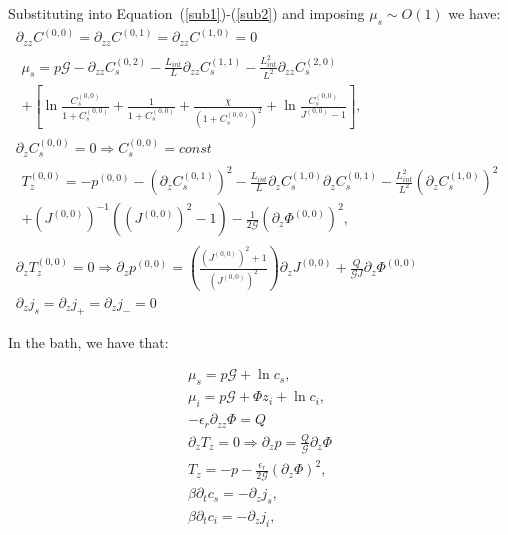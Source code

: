 Substituting into Equation~(\ref{sub1})-(\ref{sub2}) and imposing $\mu_s\sim O(1)$ we have:
\begin{gather}
\partial_{zz} C^{(0,0)}=\partial_{zz} C^{(0,1)}=\partial_{zz} C^{(1,0)}=0\\
\begin{aligned}
\mu_s = p \mathcal{G} - \partial_{zz} C^{(0,2)}_s - \frac{L_{int}}{L}\partial_{zz} C^{(1,1)}_s- \frac{L^2_{int}}{L^2}\partial_{zz} C^{(2,0)}_s\\
+\left[\ln \frac{C^{(0,0)}_s}{1+C^{(0,0)}_s}+ \frac{1}{1+C^{(0,0)}_s} +\frac{\chi}{(1+C^{(0,0)}_s)^2} + \ln \frac{C^{(0,0)}_s}{J^{(0,0)}-1} \right], 
\end{aligned}\\[2.5mm]
\partial_z C^{(0,0)}_s=0 \Rightarrow C^{(0,0)}_s= const\\
\begin{aligned}
T^{(0,0)}_z= -p^{(0,0)} -(\partial_z C^{(0,1)}_s)^2-\frac{L_{int}}{L}\partial_{z} C^{(1,0)}_s\partial_{z} C^{(0,1)}_s-\frac{L_{int}^2}{L^2}(\partial_{z} C^{(1,0)}_s)^2\\
+  (J^{(0,0)})^{-1}\left((J^{(0,0)})^2-1\right)-\frac{1}{2\mathcal{G}}(\partial_z \Phi^{(0,0)})^2,
\end{aligned}\\[2mm]
\partial_z T^{(0,0)}_z = 0 \Rightarrow \partial_z p^{(0,0)} = \left(\frac{(J^{(0,0)})^2+1}{(J^{(0,0)})^2}\right)\partial_z J^{(0,0)} + \frac{Q}{\mathcal{G}J}\partial_z \Phi^{(0,0)}\\
\partial_z j_s=\partial_z j_+=\partial_z j_- = 0
\end{gather}

In the bath, we have that:

\begin{gather}
\mu_s = p \mathcal{G}+\ln c_s ,\\
\mu_i = p \mathcal{G}+ \Phi z_i + \ln c_i ,\\
- \epsilon_r\partial_{zz}\Phi = Q\, \\
\partial_z T_z=0 \Rightarrow \partial_z p = \frac{Q}{\mathcal{G}}\partial_z \Phi\\
T_z= -p -\frac{\epsilon_r}{2\mathcal{G}}(\partial_z \Phi)^2,\\
\beta\partial_t c_s =- \partial_z j_s,\\
\beta\partial_t c_i = -\partial_z j_i,
\end{gather}

